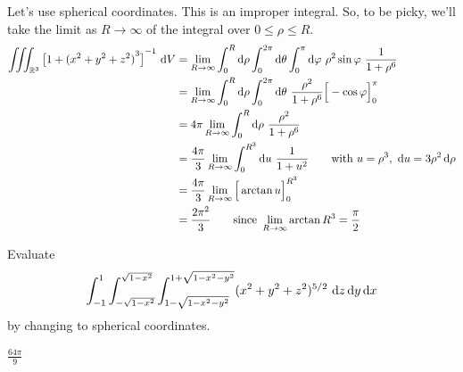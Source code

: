 \begin{solution}
Let's use spherical coordinates. This is an improper integral.
So, to be picky, we'll take the limit as $R\rightarrow\infty$
of the integral over $0\le\rho\le R$.
\begin{align*}
\tripInt_{\bbbr^3}  {\big[1+{(x^2+y^2+z^2)}^3\big]}^{-1}\ \dee{V}
&=\lim_{R\rightarrow\infty}
        \int_0^R \dee{\rho} \int_0^{2\pi}\dee{\theta} \int_0^\pi\dee{\varphi}\ 
                      \rho^2\sin\varphi\ \frac{1}{1+\rho^6} \\
&=\lim_{R\rightarrow\infty}
        \int_0^R  \dee{\rho} \int_0^{2\pi}\dee{\theta} \ 
       \frac{\rho^2}{1+\rho^6}\Big[-\cos\varphi\Big]_0^\pi \\
&=4\pi \lim_{R\rightarrow\infty}
        \int_0^R  \dee{\rho} \ \frac{\rho^2}{1+\rho^6} \\
&=\frac{4\pi}{3} \lim_{R\rightarrow\infty}
        \int_0^{R^3}  \dee{u} \ \frac{1}{1+u^2}\qquad
\text{with }u=\rho^3,\ \dee{u}=3\rho^2\,\dee{\rho} \\
&=\frac{4\pi}{3}\lim_{R\rightarrow\infty}\Big[\arctan u\Big]_0^{R^3} \\
&=\frac{2\pi^2}{3}\qquad\text{since }
            \lim_{R\rightarrow\infty}\arctan R^3=\frac{\pi}{2}
\end{align*}
\end{solution}

\begin{question}[M200 2012D] %
Evaluate
\begin{equation*}
\int_{-1}^1 \int_{-\sqrt{1-x^2}}^{\sqrt{1-x^2}}  
           \int_{1-\sqrt{1-x^2-y^2}}^{1+\sqrt{1-x^2-y^2}}
   (x^2+y^2+z^2)^{5/2}  \ \mathrm{d}z\,\mathrm{d}y\,\mathrm{d}x
\end{equation*}
by changing to spherical coordinates.
\end{question}

%

\begin{answer}
$\frac{64\pi}{9}$
\end{answer}

